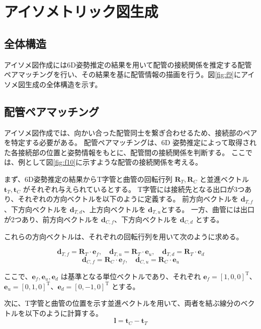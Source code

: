 \section{アイソメトリック図生成}
\subsection{全体構造}
アイソメ図作成には6D姿勢推定の結果を用いて配管の接続関係を推定する配管ペアマッチングを行い、その結果を基に配管情報の描画を行う。図\ref{fig:f9}にアイソメ図生成の全体構造を示す。

\subsection{配管ペアマッチング}
アイソメ図作成では、向かい合った配管同士を繋ぎ合わせるため、接続部のペアを特定する必要がある。
配管ペアマッチングは、6D 姿勢推定によって取得された各接続部の位置と姿勢情報をもとに、配管間の接続関係を判断する。
ここでは、例として図\ref{fig:f10}に示すような配管の接続関係を考える。

まず、6D姿勢推定の結果からT字管と曲管の回転行列 $\mathbf{R}_T, \mathbf{R}_C$ と並進ベクトル $\mathbf{t}_T, \mathbf{t}_C$ がそれぞれ与えられているとする。
T字管には接続先となる出口が3つあり、それぞれの方向ベクトルを以下のように定義する。
前方向ベクトルを $\mathbf{d}_{T,f}$、下方向ベクトルを $\mathbf{d}_{T,d}$、上方向ベクトルを $\mathbf{d}_{T,u}$とする。
一方、曲管には出口が2つあり、前方向ベクトルを $\mathbf{d}_{C,f}$、下方向ベクトルを $\mathbf{d}_{C,d}$ とする。

これらの方向ベクトルは、それぞれの回転行列を用いて次のように求める。

\[
\mathbf{d}_{T,f} = \mathbf{R}_T \cdot \mathbf{e}_f, \quad 
\mathbf{d}_{T,u} = \mathbf{R}_T \cdot \mathbf{e}_u, \quad 
\mathbf{d}_{T,d} = \mathbf{R}_T \cdot \mathbf{e}_d
\]
\[
\mathbf{d}_{C,f} = \mathbf{R}_C \cdot \mathbf{e}_f, \quad 
\mathbf{d}_{C,u} = \mathbf{R}_C \cdot \mathbf{e}_u
\]

ここで、$\mathbf{e}_f, \mathbf{e}_u, \mathbf{e}_d$ は基準となる単位ベクトルであり、それぞれ $\mathbf{e}_f = [1, 0, 0]^\mathrm{T}$、$\mathbf{e}_u = [0, 1, 0]^\mathrm{T}$、$\mathbf{e}_d = [0, -1, 0]^\mathrm{T}$ とする。

次に、T字管と曲管の位置を示す並進ベクトルを用いて、両者を結ぶ線分のベクトルを以下のように計算する。
\[
\mathbf{l} = \mathbf{t}_C - \mathbf{t}_T
\]

